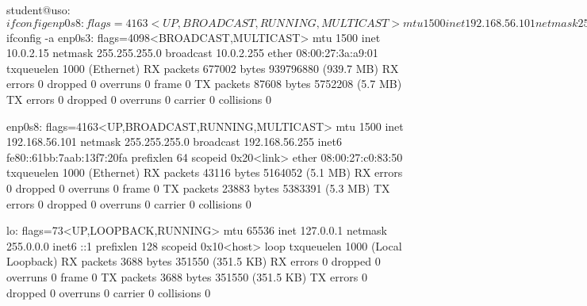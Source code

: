 \begin{screen}[caption={Vizualizarea parametrilor de rețea cu ifconfig/route},label={lst:net:show-ifconfig-route}]
student@uso:~$ ifconfig
enp0s8: flags=4163<UP,BROADCAST,RUNNING,MULTICAST>  mtu 1500
        inet 192.168.56.101  netmask 255.255.255.0  broadcast 192.168.56.255
        inet6 fe80::61bb:7aab:13f7:20fa  prefixlen 64  scopeid 0x20<link>
        ether 08:00:27:c0:83:50  txqueuelen 1000  (Ethernet)
        RX packets 43105  bytes 5163146 (5.1 MB)
        RX errors 0  dropped 0  overruns 0  frame 0
        TX packets 23877  bytes 5381787 (5.3 MB)
        TX errors 0  dropped 0 overruns 0  carrier 0  collisions 0

lo: flags=73<UP,LOOPBACK,RUNNING>  mtu 65536
        inet 127.0.0.1  netmask 255.0.0.0
        inet6 ::1  prefixlen 128  scopeid 0x10<host>
        loop  txqueuelen 1000  (Local Loopback)
        RX packets 3686  bytes 351404 (351.4 KB)
        RX errors 0  dropped 0  overruns 0  frame 0
        TX packets 3686  bytes 351404 (351.4 KB)
        TX errors 0  dropped 0 overruns 0  carrier 0  collisions 0

student@uso:~$ ifconfig -a
enp0s3: flags=4098<BROADCAST,MULTICAST>  mtu 1500
        inet 10.0.2.15  netmask 255.255.255.0  broadcast 10.0.2.255
        ether 08:00:27:3a:a9:01  txqueuelen 1000  (Ethernet)
        RX packets 677002  bytes 939796880 (939.7 MB)
        RX errors 0  dropped 0  overruns 0  frame 0
        TX packets 87608  bytes 5752208 (5.7 MB)
        TX errors 0  dropped 0 overruns 0  carrier 0  collisions 0

enp0s8: flags=4163<UP,BROADCAST,RUNNING,MULTICAST>  mtu 1500
        inet 192.168.56.101  netmask 255.255.255.0  broadcast 192.168.56.255
        inet6 fe80::61bb:7aab:13f7:20fa  prefixlen 64  scopeid 0x20<link>
        ether 08:00:27:c0:83:50  txqueuelen 1000  (Ethernet)
        RX packets 43116  bytes 5164052 (5.1 MB)
        RX errors 0  dropped 0  overruns 0  frame 0
        TX packets 23883  bytes 5383391 (5.3 MB)
        TX errors 0  dropped 0 overruns 0  carrier 0  collisions 0

lo: flags=73<UP,LOOPBACK,RUNNING>  mtu 65536
        inet 127.0.0.1  netmask 255.0.0.0
        inet6 ::1  prefixlen 128  scopeid 0x10<host>
        loop  txqueuelen 1000  (Local Loopback)
        RX packets 3688  bytes 351550 (351.5 KB)
        RX errors 0  dropped 0  overruns 0  frame 0
        TX packets 3688  bytes 351550 (351.5 KB)
        TX errors 0  dropped 0 overruns 0  carrier 0  collisions 0

\end{screen}

